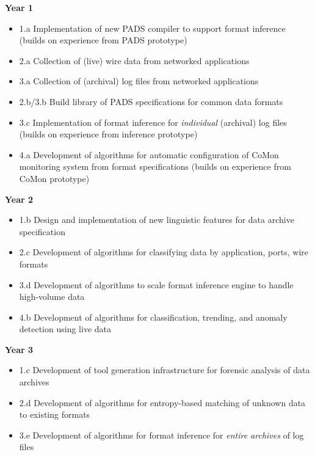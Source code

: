 

\noindent
{\bf Year 1}
\begin{itemize}
\item 1.a Implementation of new PADS compiler to support format inference 
(builds on experience from PADS prototype)
\item 2.a Collection of (live) wire data from networked applications
\item 3.a Collection of (archival) log files from networked applications
\item 2.b/3.b Build library of PADS specifications for common data formats
\item 3.c Implementation of format inference for {\em individual} (archival) log files
(builds on experience from inference prototype)
\item 4.a Development of algorithms for automatic configuration of CoMon monitoring system 
from format specifications (builds on experience from CoMon prototype)
\end{itemize}

\noindent
{\bf Year 2}
\begin{itemize}
\item 1.b Design and implementation of new linguistic features for data archive specification
\item 2.c Development of algorithms for classifying data by application, ports, wire formats
\item 3.d Development of algorithms to scale format inference engine to handle high-volume 
data
\item 4.b Development of algorithms for classification, trending, and 
anomaly detection using live data
\end{itemize}

\noindent
{\bf Year 3}
\begin{itemize}
\item 1.c Development of tool generation infrastructure for forensic analysis of data archives
\item 2.d Development of algorithms for entropy-based matching of unknown data to existing formats
\item 3.e Development of algorithms for format inference for {\em entire archives} of log files
\end{itemize}


